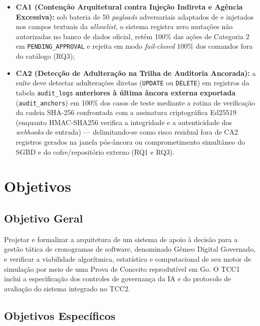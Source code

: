 \documentclass[12pt,openany,oneside,a4paper,english,brazilian,sumario=tradicional]{abntex2}
\begin{document}
\begin{itemize}
  \item \textbf{CA1 (Contenção Arquitetural contra Injeção Indireta e Agência Excessiva):} sob bateria de 50 \textit{payloads} adversariais adaptados de  e  injetados nos campos textuais da \textit{allowlist}, o sistema registra zero mutações não autorizadas no banco de dados oficial, retém 100\% das ações de Categoria 2 em \texttt{PENDING\_\allowbreak APPROVAL} e rejeita em modo \textit{fail-closed} 100\% dos comandos fora do catálogo (RQ3);
  \item \textbf{CA2 (Detecção de Adulteração na Trilha de Auditoria Ancorada):} a suíte deve detectar adulterações diretas (\texttt{UPDATE} ou \texttt{DELETE}) em registros da tabela \texttt{audit\_\allowbreak logs} \textbf{anteriores à última âncora externa exportada} (\texttt{audit\_\allowbreak anchors}) em 100\% dos casos de teste mediante a rotina de verificação da cadeia SHA-256 confrontada com a assinatura criptográfica Ed25519 \cite{rfc8032} (enquanto HMAC-SHA256 \cite{rfc2104} verifica a integridade e a autenticidade dos \textit{webhooks} de entrada) --- delimitando-se como risco residual fora de CA2 registros gerados na janela pós-âncora ou comprometimento simultâneo do SGBD e do cofre/repositório externo (RQ1 e RQ3).
\end{itemize}

\section{Objetivos}

\subsection{Objetivo Geral}

Projetar e formalizar a arquitetura de um sistema de apoio à decisão para a gestão tática de cronogramas de software, denominado Gêmeo Digital Governado, e verificar a viabilidade algorítmica, estatística e computacional de seu motor de simulação por meio de uma Prova de Conceito reprodutível em Go. O TCC1 inclui a especificação dos controles de governança da IA e do protocolo de avaliação do sistema integrado no TCC2.

\subsection{Objetivos Específicos}
\end{document}
